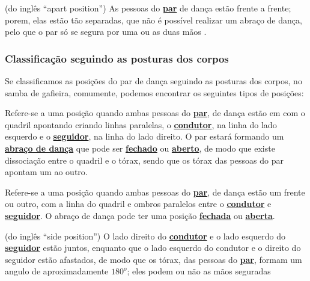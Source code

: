 \begin{definition}
\label{def:apart-position} (do inglês ``apart position'') 
As pessoas do \hyperref[def:Par]{\textbf{par}} de dança estão frente a frente;
porem, elas estão tão separadas, 
que não é possível realizar um abraço de dança, 
pelo que o par só se segura por uma ou as duas mãos \cite{fletsher2015improve}.
\end{definition}

\subsubsection{Classificação seguindo as posturas dos corpos}
Se classificamos as posições do par de dança seguindo as posturas dos corpos,
no samba de gafieira, comumente, podemos encontrar os seguintes tipos de posições:

\begin{definition}[Posição de X:]
\label{def:X-position} 
Refere-se a uma posição quando ambas pessoas do \hyperref[def:Par]{\textbf{par}}, 
de dança estão em com o quadril apontando criando linhas paralelas,
o \hyperref[def:Condutor]{\textbf{condutor}}, na linha do lado esquerdo e
o \hyperref[def:Seguidor]{\textbf{seguidor}}, na linha do lado direito.
O par estará formando um \hyperref[def:abracodedanca]{\textbf{abraço de dança}}
que pode ser \hyperref[def:closed-position]{\textbf{fechado}} 
ou \hyperref[def:open-position]{\textbf{aberto}},
de modo que existe dissociação entre o quadril e o tórax,
sendo que os tórax das pessoas do par apontam um ao outro.
\end{definition}

\begin{definition}
\label{def:frente-frente-position} 
Refere-se a uma posição quando ambas pessoas do \hyperref[def:Par]{\textbf{par}}, 
de dança estão um frente ou outro,
com a linha do quadril e ombros paralelos entre o 
\hyperref[def:Condutor]{\textbf{condutor}} e
\hyperref[def:Seguidor]{\textbf{seguidor}}.
O abraço de dança pode ter uma posição \hyperref[def:closed-position]{\textbf{fechada}} 
ou \hyperref[def:open-position]{\textbf{aberta}}.
\end{definition}

\begin{definition}
\label{def:lateral-position}  (do inglês ``side position'') 
O lado direito do \hyperref[def:Condutor]{\textbf{condutor}} e o 
lado esquerdo do \hyperref[def:Seguidor]{\textbf{seguidor}} estão juntos,
enquanto que o lado esquerdo do condutor e o direito do seguidor estão afastados,
de modo que os tórax, das pessoas do \hyperref[def:Par]{\textbf{par}}, formam um angulo de aproximadamente $180^o$;
eles podem ou não as mãos seguradas \cite{fletsher2015improve}
\end{definition}



